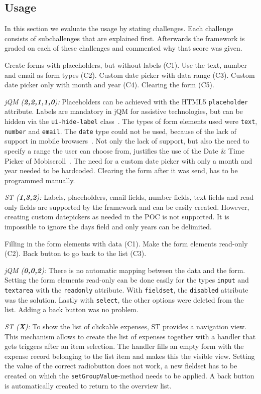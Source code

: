 \documentclass[a4paper]{artikel3}
\newcommand{\code}[1]{\texttt{#1}}
\renewcommand{\paragraph}[1]{\vspace{2mm} \noindent {\bf #1}  }
\newcommand{\framework}[2]{ \emph{#1 (\textbf{#2}): }} %
\newcommand{\challenge}[1]{\paragraph{#1}}
\begin{document}
\subsection{Usage}
\label{sec:poc}
In this section we evaluate the usage by stating challenges.
Each challenge consists of subchallenges that are explained first.
Afterwards the framework is graded on each of these challenges and commented why that score was given.

\challenge{Forms (C1,C2,C3,C4,C5)}
Create forms with placeholders, but without labels (C1).
Use the text, number and email as form types (C2).
Custom date picker with data range (C3).
Custom date picker only with month and year (C4).
Clearing the form (C5).

\framework{jQM}{2,2,1,1,0}
Placeholders can be achieved with the HTML5 \code{placeholder} attribute.
Labels are mandatory in jQM for assistive technologies, but can be hidden via the \code{ui-hide-label} class~\cite{JQuery2013}. 
The types of form elements used were \code{text}, \code{number} and \code{email}.
The \code{date} type could not be used, because of the lack of support in mobile browsers~\cite{Deveria2013b}.
Not only the lack of support, but also the need to specify a range the user can choose from, justifies the use of the Date \& Time Picker of Mobiscroll~\cite{Mobiscroll2013}.
The need for a custom date picker with only a month and year needed to be hardcoded.
Clearing the form after it was send, has to be programmed manually.

\framework{ST}{1,3,2}
Labels,  placeholders,  email fields, number fields, text fields and read-only fields are supported by the framework and can be easily created.  However, creating custom datepickers as needed in the POC is not supported.  It is impossible to ignore the days field and only years can be delimited.  

\challenge{Form filling (C1,C2,C3)}
Filling in the form elements with data (C1).
Make the form elements read-only (C2).
Back button to go back to the list (C3).

\framework{jQM}{0,0,2}
There is no automatic mapping between the data and the form.
Setting the form elements read-only can be done easily for the types \code{input} and \code{textarea} with the \code{readonly} attribute.
With \code{fieldset}, the \code{disabled} attribute was the solution.
Lastly with \code{select}, the other options were deleted from the list.
Adding a back button was no problem.

\framework{ST}{X}
To show the list of clickable expenses,  ST provides a navigation view.  This mechanism allows to create the list of expenses together with a handler that gets triggers after an item selection.  The handler fills an empty form with the expense record belonging to the list item and makes this the visible view.  Setting the value of the correct radiobutton does not work,  a new fieldset has to be created on which the \code{setGroupValue}-method needs to be applied.  A back button is automatically created to return to the overview list.
\end{document}
